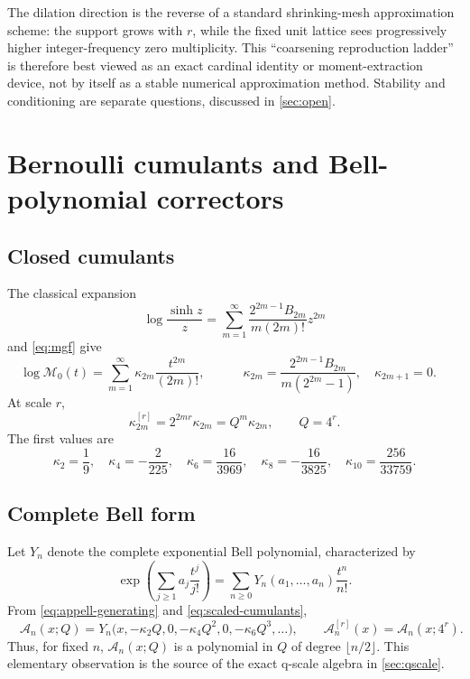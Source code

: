 \documentclass[11pt,oneside]{article}
\theoremstyle{definition}
\theoremstyle{remark}
\newcommand{\Acard}{\mathcal A}
\newcommand{\M}{\mathcal M}
\begin{document}
\begin{corpusdeductionbox}
The dilation direction is the reverse of a standard shrinking-mesh approximation scheme: the support grows with $r$, while the fixed unit lattice sees progressively higher integer-frequency zero multiplicity.  This ``coarsening reproduction ladder'' is therefore best viewed as an exact cardinal identity or moment-extraction device, not by itself as a stable numerical approximation method.  Stability and conditioning are separate questions, discussed in \cref{sec:open}.
\end{corpusdeductionbox}

\section{Bernoulli cumulants and Bell-polynomial correctors}
\label{sec:bernoulli-bell}

\subsection{Closed cumulants}
The classical expansion
\begin{equation}
 \log\frac{\sinh z}{z}
 =\sum_{m=1}^{\infty}
 \frac{2^{2m-1}B_{2m}}{m(2m)!}z^{2m}
 \label{eq:logsinh}
\end{equation}
and \eqref{eq:mgf} give
\begin{equation}
 \log\M_0(t)=\sum_{m=1}^{\infty}\kappa_{2m}\frac{t^{2m}}{(2m)!},
 \qquad
 \boxed{\quad
 \kappa_{2m}=\frac{2^{2m-1}B_{2m}}{m(2^{2m}-1)},
 \quad \kappa_{2m+1}=0.
 \quad}
 \label{eq:cumulants}
\end{equation}
At scale $r$,
\begin{equation}
 \kappa_{2m}^{[r]}=2^{2mr}\kappa_{2m}=Q^m\kappa_{2m},
 \qquad Q=4^r.
 \label{eq:scaled-cumulants}
\end{equation}
The first values are
\begin{equation}
 \kappa_2=\frac19,
 \quad \kappa_4=-\frac2{225},
 \quad \kappa_6=\frac{16}{3969},
 \quad \kappa_8=-\frac{16}{3825},
 \quad \kappa_{10}=\frac{256}{33759}.
 \label{eq:cumulant-values}
\end{equation}

\subsection{Complete Bell form}
Let $Y_n$ denote the complete exponential Bell polynomial, characterized by
\[
 \exp\!\left(\sum_{j\ge1}a_j\frac{t^j}{j!}\right)
 =\sum_{n\ge0}Y_n(a_1,\ldots,a_n)\frac{t^n}{n!}.
\]
From \eqref{eq:appell-generating} and \eqref{eq:scaled-cumulants},
\begin{equation}
 \boxed{\quad
 \Acard_n(x;Q)
 =Y_n\bigl(x,-\kappa_2Q,0,-\kappa_4Q^2,0,-\kappa_6Q^3,\ldots\bigr),
 \qquad \Acard_n^{[r]}(x)=\Acard_n(x;4^r).
 \quad}
 \label{eq:bell-appell}
\end{equation}
Thus, for fixed $n$, $\Acard_n(x;Q)$ is a polynomial in $Q$ of degree $\lfloor n/2\rfloor$.  This elementary observation is the source of the exact q-scale algebra in \cref{sec:qscale}.
\end{document}
